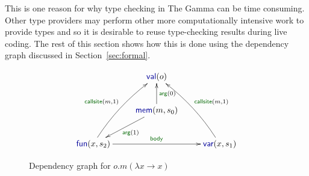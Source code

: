 \documentclass[acmsmall,anonymous,fleqn]{acmart}\settopmatter{printfolios=false,printccs=false,printacmref=false}
\theoremstyle{plain}
\theoremstyle{definition}
\newcommand{\bnd}[1]{\textnormal{\textcolor{kvdclr}{\sffamily #1}}}
\newcommand{\blbl}[1]{\textnormal{\textcolor{numclr}{\sffamily #1}}}
\begin{document}
This is one reason for why type checking in The Gamma can be time consuming. Other
type providers may perform other more computationally intensive work to provide types and so
it is desirable to reuse type-checking results during live coding. The rest of this section
shows how this is done using the dependency graph discussed in Section~\ref{sec:formal}.

\begin{figure}[!b]
\vspace{-0.5em}
\begin{equation*}
\xymatrix{
&\bnd{val}(o)\\
&\bnd{mem}(m, s_0) \ar[u]_{\blbl{arg}(0)} \ar[dl]^{\blbl{arg}(1)} \\
\bnd{fun}(x, s_2) \ar@/^/[uur]^{\blbl{callsite}(m, 1)} \ar[rr]^{\blbl{body}} && \bnd{var}(x, s_1) \ar@/_/[uul]_{\blbl{callsite}(m, 1)}
}
\end{equation*}
\caption{Dependency graph for $o.m(\lambda x\rightarrow x)$}
\label{fig:graph-func}
\end{figure}

\end{document}
